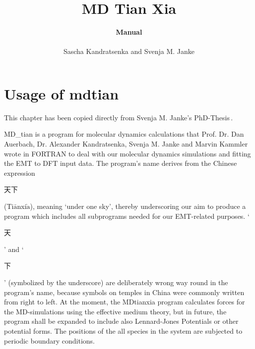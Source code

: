 \documentclass[twoside, 11pt, titlepage, captions=nooneline, a4paper, headsepline]{scrbook}%
\title{\huge{MD Tian Xia}}
\author{\textbf{Manual}\\ \\Sascha Kandratsenka and Svenja M. Janke}
\date{}
\newcommand{\9}{\mathrm}
\newcommand{\0}{\,\mathrm}
\begin{document}
\frontmatter

\maketitle
\thispagestyle{empty}
\newpage
\tableofcontents
\newpage


\mainmatter

\chapter{Usage of mdtian}
\label{Sec:usage:MDtian}
This chapter has been copied directly from Svenja M. Janke's PhD-Thesis\,\cite{svenjaphd}.

MD\_tian is a program for molecular dynamics calculations that Prof. Dr. Dan Auerbach, Dr. Alexander Kandratsenka, Svenja M. Janke and Marvin Kammler wrote in FORTRAN to deal with our molecular dynamics simulations and fitting the EMT to DFT input data. The program's name derives from the Chinese expression
\begin{CJK*}{UTF8}{gbsn}
天下
\end{CJK*}
(Ti$\bar{\mathrm{a}}$nxi$\grave{\mathrm{a}}$), meaning `under one sky', thereby underscoring our aim to produce a program which includes all subprograms needed for our EMT-related purposes. `\begin{CJK*}{UTF8}{gbsn}
天
\end{CJK*}' and `\begin{CJK*}{UTF8}{gbsn}
下
\end{CJK*}' (symbolized by the underscore) are deliberately wrong way round in the program's name, because symbols on temples in China were commonly written from right to left.
At the moment, the MDtianxia program calculates forces for the MD-simulations using the effective medium theory, but in future, the program shall be expanded to include also Lennard-Jones Potentials or other potential forms. 
The positions of the all species in the system are subjected to periodic boundary conditions.
\end{document}

